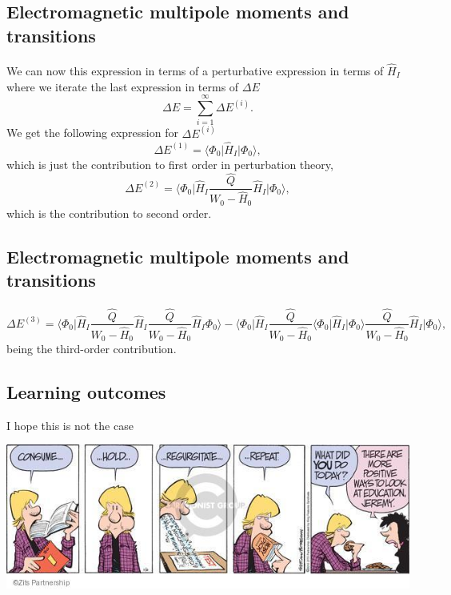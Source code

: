 \documentclass[%
oneside,                 %
final,                   %
10pt]{article}
\begin{document}
\subsection{Electromagnetic multipole moments and transitions}

\paragraph{}
We can now this expression in terms of a perturbative expression in terms
of $\hat{H}_I$ where we iterate the last expression in terms of $\Delta E$
\[
\Delta E=\sum_{i=1}^{\infty}\Delta E^{(i)}.
\]
We get the following expression for $\Delta E^{(i)}$
\[
\Delta E^{(1)}=\langle \Phi_0\vert \hat{H}_I\vert \Phi_0\rangle,
\] 
which is just the contribution to first order in perturbation theory,
\[
\Delta E^{(2)}=\langle\Phi_0\vert \hat{H}_I\frac{\hat{Q}}{W_0-\hat{H}_0}\hat{H}_I\vert \Phi_0\rangle, 
\]
which is the contribution to second order.



\subsection{Electromagnetic multipole moments and transitions}

\paragraph{}
\[
\Delta E^{(3)}=\langle \Phi_0\vert \hat{H}_I\frac{\hat{Q}}{W_0-\hat{H}_0}\hat{H}_I\frac{\hat{Q}}{W_0-\hat{H}_0}\hat{H}_I\Phi_0\rangle-
\langle\Phi_0\vert \hat{H}_I\frac{\hat{Q}}{W_0-\hat{H}_0}\langle \Phi_0\vert \hat{H}_I\vert \Phi_0\rangle\frac{\hat{Q}}{W_0-\hat{H}_0}\hat{H}_I\vert \Phi_0\rangle,
\]
being the third-order contribution.





\subsection{Learning outcomes}

I hope this is not the case


\centerline{\includegraphics[width=0.6\linewidth]{figures/exam2.jpg}}
\end{document}
